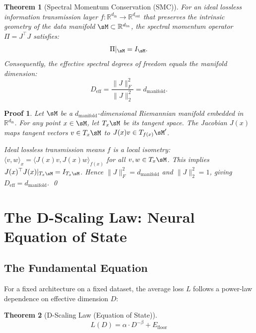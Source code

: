 \documentclass[11pt, a4paper]{article}
\def\R{{\mathbb R}}
\newtheorem{theo}{Theorem}[section]
\theoremstyle{plain}
\newtheorem*{pf}{Proof}
\begin{document}
\begin{theo}[Spectral Momentum Conservation (SMC)]\label{theo:smc}
For an ideal lossless information transmission layer $f: \R^{d_{\mathrm{in}}} \to \R^{d_{\mathrm{out}}}$ that preserves the intrinsic geometry of the data manifold $\sM \subset \R^{d_{\mathrm{in}}}$, the spectral momentum operator $\Pi = J^\top J$ satisfies:
\begin{equation}
\Pi|_{\sM} = I_{\sM}.
\end{equation}
Consequently, the effective spectral degrees of freedom equals the manifold dimension:
\begin{equation}
D_{\mathrm{eff}} = \frac{\|J\|_F^2}{\|J\|_2^2} = d_{\mathrm{manifold}}.
\end{equation}
\end{theo}

\begin{pf}
Let $\sM$ be a $d_{\mathrm{manifold}}$-dimensional Riemannian manifold embedded in $\R^{d_{\mathrm{in}}}$. For any point $x \in \sM$, let $T_x\sM$ be its tangent space. The Jacobian $J(x)$ maps tangent vectors $v \in T_x\sM$ to $J(x)v \in T_{f(x)}\sM'$.

Ideal lossless transmission means $f$ is a local isometry: $\langle v, w\rangle_x = \langle J(x)v, J(x)w\rangle_{f(x)}$ for all $v,w \in T_x\sM$. This implies $J(x)^\top J(x)|_{T_x\sM} = I_{T_x\sM}$. Hence $\|J\|_F^2 = d_{\mathrm{manifold}}$ and $\|J\|_2^2 = 1$, giving $D_{\mathrm{eff}} = d_{\mathrm{manifold}}$.
\qed
\end{pf}

\section{The D-Scaling Law: Neural Equation of State}

\subsection{The Fundamental Equation}

For a fixed architecture on a fixed dataset, the average loss $L$ follows a power-law dependence on effective dimension $D$:

\begin{theo}[D-Scaling Law (Equation of State)]\label{theo:dscaling}
\begin{equation}
\boxed{L(D) = \alpha \cdot D^{-\beta} + E_{\mathrm{floor}}}
\end{equation}
\end{theo}
\end{document}
